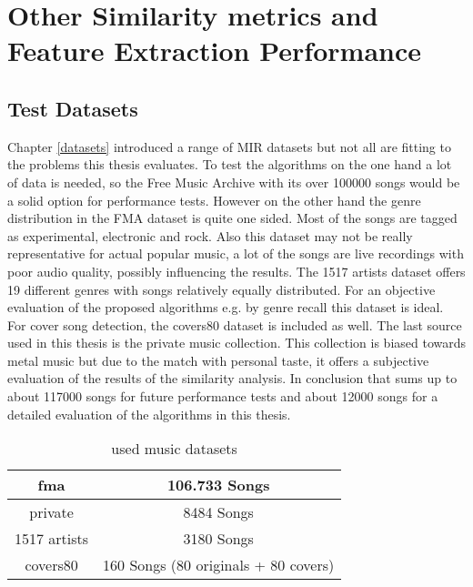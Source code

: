 
\chapter{Other Similarity metrics and Feature Extraction Performance}\label{simmet}

\section{Test Datasets}

Chapter \ref{datasets} introduced a range of MIR datasets but not all are fitting to the problems this thesis evaluates. To test the algorithms on the one hand a lot of data is needed, so the Free Music Archive with its over 100000 songs would be a solid option for performance tests. However on the other hand the genre distribution in the FMA dataset is quite one sided. Most of the songs are tagged as experimental, electronic and rock. Also this dataset may not be really representative for actual popular music, a lot of the songs are live recordings with poor audio quality, possibly influencing the results.
The 1517 artists dataset offers 19 different genres with songs relatively equally distributed. For an objective evaluation of the proposed algorithms e.g. by genre recall this dataset is ideal. For cover song detection, the covers80 dataset is included as well.
The last source used in this thesis is the private music collection. This collection is biased towards metal music but due to the match with personal taste, it offers a subjective evaluation of the results of the similarity analysis. 
In conclusion that sums up to about 117000 songs for future performance tests and about 12000 songs for a detailed evaluation of the algorithms in this thesis.\\

\begin{table}[h]
	\caption{used music datasets}
	\label{used_dsets}
	\begin{center}
		\begin{tabular}{|c||c|}
			\hline
			fma & 106.733 Songs\\
			\hline
			private & 8484 Songs\\
			\hline
			1517 artists & 3180 Songs\\
			\hline
			covers80 & 160 Songs (80 originals + 80 covers)\\
			\hline
		\end{tabular}
	\end{center}
\end{table}

